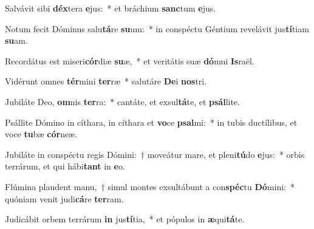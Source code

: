 \item Salvávit sibi \textbf{déx}tera \textbf{e}jus:~* et bráchium \textbf{sanc}tum \textbf{e}jus.
\item Notum fecit Dóminus salu\textbf{tá}re \textbf{su}um:~* in conspéctu Géntium revelávit jus\textbf{tí}tiam \textbf{su}am.
\item Recordátus est miseri\textbf{cór}diæ \textbf{su}æ,~* et veritátis suæ \textbf{dó}mui \textbf{Is}raël.
\item Vidérunt omnes \textbf{tér}mini \textbf{ter}ræ~* salutáre \textbf{De}i \textbf{nos}tri.
\item Jubiláte Deo, \textbf{om}nis \textbf{ter}ra:~* cantáte, et exsul\textbf{tá}te, et \textbf{psál}lite.
\item Psállite Dómino in cíthara, in cíthara et \textbf{vo}ce \textbf{psal}mi:~* in tubis ductílibus, et voce \textbf{tu}bæ \textbf{cór}neæ.
\item Jubiláte in conspéctu regis Dómini:~† moveátur mare, et pleni\textbf{tú}do \textbf{e}jus:~* orbis terrárum, et qui hábi\textbf{tant} in \textbf{e}o.
\item Flúmina plaudent manu,~† simul montes exsultábunt a con\textbf{spéc}tu \textbf{Dó}mini:~* quóniam venit judi\textbf{cá}re \textbf{ter}ram.
\item Judicábit orbem terrárum \textbf{in} jus\textbf{tí}tia,~* et pópulos in \textbf{æ}qui\textbf{tá}te.
